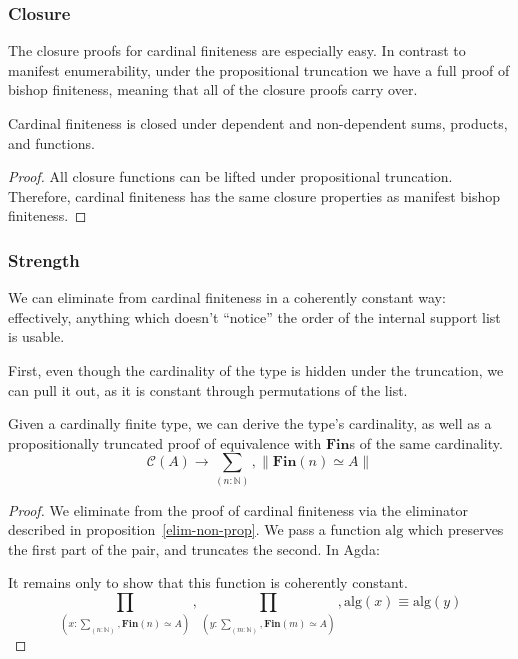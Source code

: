 \begin{refsection}
\subsubsection{Closure}
The closure proofs for cardinal finiteness are especially easy.
In contrast to manifest enumerability, under the propositional truncation we
have a full proof of bishop finiteness, meaning that all of the closure proofs
carry over.
\begin{lemma}
  Cardinal finiteness is closed under dependent and non-dependent sums,
  products, and functions.
\end{lemma}
\begin{proof}
  All closure functions can be lifted under propositional truncation.
  Therefore, cardinal finiteness has the same closure properties as manifest
  bishop finiteness.
\end{proof}
\subsubsection{Strength}
We can eliminate from cardinal finiteness in a coherently constant way:
effectively, anything which doesn't ``notice'' the order of the internal support
list is usable.

First, even though the cardinality of the type is hidden under the truncation,
we can pull it out, as it is constant through permutations of the list.
\begin{theorem}
  Given a cardinally finite type, we can derive the type's cardinality, as well
  as a propositionally truncated proof of equivalence with \(\textbf{Fin}\)s of
  the same cardinality.
  \begin{equation}
    \mathcal{C}(A) \rightarrow \sum_{(n : \mathbb{N})} , \lVert \textbf{Fin}(n) \simeq A \rVert
  \end{equation}
\end{theorem}
\begin{proof}
  We eliminate from the proof of cardinal finiteness via the eliminator
  described in proposition~\ref{elim-non-prop}.
  We pass a function \(\text{alg}\) which preserves the first part of the pair,
  and truncates the second.
  In Agda:

  It remains only to show that this function is coherently constant.
  \begin{equation}
    \prod_{(x : \sum_{(n : \mathbb{N})} , \textbf{Fin}(n) \simeq A)} ,
    \prod_{(y : \sum_{(m : \mathbb{N})} , \textbf{Fin}(m) \simeq A)} ,
    \text{alg}(x) \equiv \text{alg}(y)
  \end{equation}


\end{proof}
\end{refsection}
